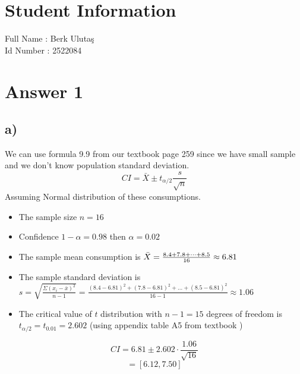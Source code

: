 \documentclass[12pt]{article}
\begin{document}
\section*{Student Information } 
Full Name : Berk Ulutaş \\
Id Number : 2522084 \\


\section*{Answer 1}

\subsection*{a)} 
We can use formula 9.9 from our textbook page 259 since we have small sample and we don't know population standard deviation.\\
$$CI = \bar{X} \pm t_{\alpha/2}\frac{s}{\sqrt{n}}$$
Assuming Normal distribution of these consumptions.
\begin{itemize}
    \item The sample size $n= 16$
    \item Confidence $1-\alpha = 0.98$ then $\alpha = 0.02$
    \item The sample mean consumption is $\Bar{X} = \frac{8.4+7.8+\dots+8.5}{16} \approx 6.81$
    \item The sample standard deviation is $s = \sqrt{\frac{\Sigma (x_i - \bar{x})^2}{n-1}} = \frac{(8.4-6.81)^2 + (7.8-6.81)^2 + \dots + (8.5-6.81)^2}{16-1} \approx 1.06 $
    \item The critical value of $t$ distribution with $n-1 = 15$ degrees of freedom is $t_{\alpha/2} = t_{0.01} = 2.602$ (using appendix table A5 from textbook )
\end{itemize}
$$CI = 6.81 \pm 2.602\cdot\dfrac{1.06}{\sqrt{16}}$$ 
$$= [6.12, 7.50]$$
\end{document}
